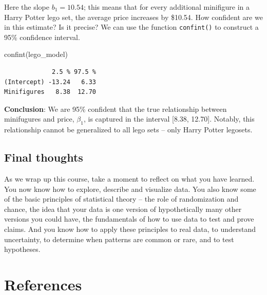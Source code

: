 \documentclass[
  letterpaper,
  DIV=11,
  numbers=noendperiod]{scrreprt}
\newenvironment{Shaded}{\begin{snugshade}}{\end{snugshade}}
\newcommand{\FunctionTok}[1]{\textcolor[rgb]{0.28,0.35,0.67}{#1}}
\newcommand{\NormalTok}[1]{\textcolor[rgb]{0.00,0.23,0.31}{#1}}
\theoremstyle{definition}
\theoremstyle{remark}
\begin{document}
Here the slope \(b_1 = 10.54\); this means that for every additional
minifigure in a Harry Potter lego set, the average price increases by
\$10.54. How confident are we in this estimate? Is it precise? We can
use the function \texttt{confint()} to construct a 95\% confidence
interval.

\begin{Shaded}
\begin{Highlighting}[]
\FunctionTok{confint}\NormalTok{(lego\_model)}
\end{Highlighting}
\end{Shaded}

\begin{verbatim}
             2.5 % 97.5 %
(Intercept) -13.24   6.33
Minifigures   8.38  12.70
\end{verbatim}

\textbf{Conclusion}: We are 95\% confident that the true relationship
between minifugures and price, \(\beta_1\), is captured in the interval
{[}8.38, 12.70{]}. Notably, this relationship cannot be generalized to
all lego sets -- only Harry Potter legosets.

\hypertarget{final-thoughts}{%
\section{Final thoughts}\label{final-thoughts}}

As we wrap up this course, take a moment to reflect on what you have
learned. You now know how to explore, describe and visualize data. You
also know some of the basic principles of statistical theory -- the role
of randomization and chance, the idea that your data is one version of
hypothetically many other versions you could have, the fundamentals of
how to use data to test and prove claims. And you know how to apply
these principles to real data, to understand uncertainty, to determine
when patterns are common or rare, and to test hypotheses.

\hypertarget{references}{%
\chapter*{References}\label{references}}
\end{document}
